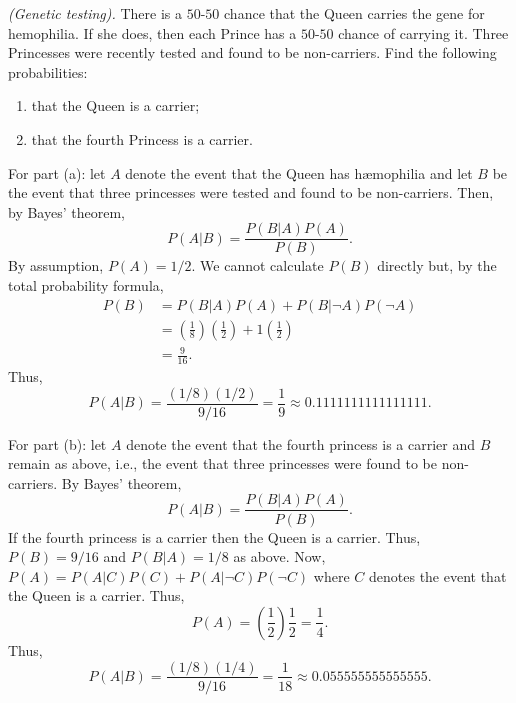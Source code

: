 \begin{problem}[Handout 5, \# 2]
  \emph{(Genetic testing).} There is a \(50\)-\(50\) chance that the Queen
  carries the gene for hemophilia. If she does, then each Prince has a
  \(50\)-\(50\) chance of carrying it. Three Princesses were recently
  tested and found to be non-carriers. Find the following probabilities:
  \begin{enumerate}[label=(\alph*),noitemsep]
  \item that the Queen is a carrier;
  \item that the fourth Princess is a carrier.
  \end{enumerate}
\end{problem}
\begin{solution}
  For part (a): let \(A\) denote the event that the Queen has hæmophilia
  and let \(B\) be the event that three princesses were tested and found to
  be non-carriers. Then, by Bayes' theorem,
  \[
    P(A|B)=\frac{P(B|A)P(A)}{P(B)}.
  \]
  By assumption, \(P(A)=1/2\). We cannot calculate \(P(B)\) directly
  but, by the total probability formula,
  \begin{align*}
    P(B)&=P(B|A)P(A)+P(B|\lnot A)P(\lnot A)\\
        &=\left(\frac{1}{8}\right)\left(\frac{1}{2}\right)
          +1\left(\frac{1}{2}\right)\\
        &=\frac{9}{16}.
  \end{align*}
  Thus,
  \[
    P(A|B)=\frac{(1/8)(1/2)}{9/16}=\frac{1}{9}\approx\num{0.1111111111111111}.
  \]

  For part (b): let \(A\) denote the event that the fourth princess is a
  carrier and \(B\) remain as above, i.e., the event that three princesses
  were found to be non-carriers. By Bayes' theorem,
  \[
    P(A|B)=\frac{P(B|A)P(A)}{P(B)}.
  \]
  If the fourth princess is a carrier then the Queen is a carrier. Thus,
  \(P(B)=9/16\) and \(P(B|A)=1/8\) as above. Now,
  \(P(A)=P(A|C)P(C)+P(A|\lnot C)P(\lnot C)\) where \(C\) denotes the event
  that the Queen is a carrier. Thus,
  \[
    P(A)=\left(\frac{1}{2}\right)\frac{1}{2}=\frac{1}{4}.
  \]
  Thus,
  \[
    P(A|B)=\frac{(1/8)(1/4)}{9/16}=\frac{1}{18}\approx\num{0.055555555555555}.
  \]
\end{solution}
\newpage

